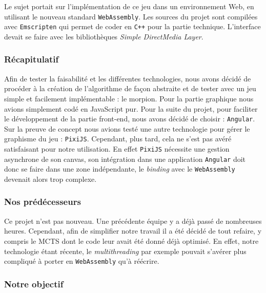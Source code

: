 \documentclass[a4paper,11pt]{article}
\begin{document}
Le sujet portait sur l'implémentation de ce jeu dans un environnement
Web, en utilisant le nouveau standard \texttt{WebAssembly}. Les sources
du projet sont compilées avec \texttt{Emscripten} qui permet de coder en
\texttt{C++} pour la partie technique. L'interface devait se faire avec
les bibliothèques \emph{Simple DirectMedia Layer}.

\hypertarget{ruxe9capitulatif}{%
\subsubsection{Récapitulatif}\label{ruxe9capitulatif}}

Afin de tester la faisabilité et les différentes technologies, nous
avons décidé de procéder à la création de l'algorithme de façon
abstraite et de tester avec un jeu simple et facilement implémentable :
le morpion. Pour la partie graphique nous avions simplement codé en
JavaScript pur. Pour la suite du projet, pour faciliter le développement
de la partie front-end, nous avons décidé de choisir : \texttt{Angular}.
Sur la preuve de concept nous avions testé une autre technologie pour
gérer le graphisme du jeu : \texttt{PixiJS}. Cependant, plus tard, cela
ne s'est pas avéré satisfaisant pour notre utilisation. En effet
\texttt{PixiJS} nécessite une gestion asynchrone de son canvas, son
intégration dans une application \texttt{Angular} doit donc se faire
dans une zone indépendante, le \emph{binding} avec le
\texttt{WebAssembly} devenait alors trop complexe.

\hypertarget{nos-pruxe9duxe9cesseurs}{%
\subsubsection{Nos prédécesseurs}\label{nos-pruxe9duxe9cesseurs}}

Ce projet n'est pas nouveau. Une précédente équipe y a déjà passé de
nombreuses heures. Cependant, afin de simplifier notre travail il a été
décidé de tout refaire, y compris le MCTS dont le code leur avait été
donné déjà optimisé. En effet, notre technologie étant récente, le
\emph{multithreading} par exemple pouvait s'avérer plus compliqué à
porter en \texttt{WebAssembly} qu'à réécrire.

\hypertarget{notre-objectif}{%
\subsubsection{Notre objectif}\label{notre-objectif}}
\end{document}

